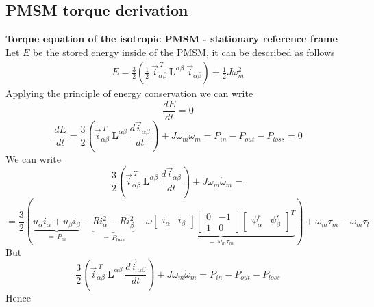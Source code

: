 \documentclass[11pt,a4paper]{article}
\numberwithin{equation}{section}
\theoremstyle{it}
\theoremstyle{definition}
\begin{document}
\begin{onehalfspace}
\subsection{PMSM torque derivation}
\textbf{Torque equation of the isotropic PMSM - stationary reference frame}\\
Let $E$ be the stored energy inside of the PMSM, it can be described as follows
\begin{equation*}
	\begin{aligned}
		E = \frac{3}{2} \left(\frac{1}{2}\ \vec{i}_{\alpha\beta}^{\ T}\ \mathbf{L}^{\alpha\beta}\ \vec{i}_{\alpha\beta}\right) +\frac{1}{2}J\omega_m^2
	\end{aligned} 
\end{equation*}
Applying the principle of energy conservation we can write
\begin{equation*}
	\frac{dE}{dt} = 0
\end{equation*}
\begin{equation*}
	\frac{dE}{dt} = \frac{3}{2} \left( \vec{i}_{\alpha\beta}^{\ T}\ \mathbf{L}^{\alpha\beta}\ \frac{d\vec{i}_{\alpha\beta}}{dt}\right) + J\omega_m\dot{\omega}_m= P_{in}-P_{out}-P_{loss} = 0
\end{equation*}
We can write
\begin{equation*}
	\frac{3}{2} \left( \vec{i}_{\alpha\beta}^{\ T}\ \mathbf{L}^{\alpha\beta}\ \frac{d\vec{i}_{\alpha\beta}}{dt}\right) + J\omega_m\dot{\omega}_m =
\end{equation*}
\begin{equation*}
	=\frac{3}{2}\left( \underbrace{u_\alpha i_\alpha+u_\beta i_\beta}_{=\,P_{in}}-\underbrace{Ri_\alpha^2-Ri_\beta^2}_{=\,P_{loss}}-\underbrace{\omega 
		\begin{bmatrix} i_\alpha & i_\beta \end{bmatrix}
		\begin{bmatrix} 0 & -1 \\ 1 & 0\end{bmatrix}
		\begin{bmatrix} \psi^r_\alpha & \psi^r_\beta \end{bmatrix}^T
	}_{=\,\omega_m\tau_m}\right)  +\omega_m\tau_m-\omega_m\tau_l
\end{equation*}
But 
\begin{equation*}
	\frac{3}{2} \left( \vec{i}_{\alpha\beta}^{\ T}\ \mathbf{L}^{\alpha\beta}\ \frac{d\vec{i}_{\alpha\beta}}{dt}\right) + J\omega_m\dot{\omega}_m= P_{in}-P_{out}-P_{loss}
\end{equation*}
Hence
\begin{equation*}

\end{equation*}
\end{onehalfspace}
\end{document}
